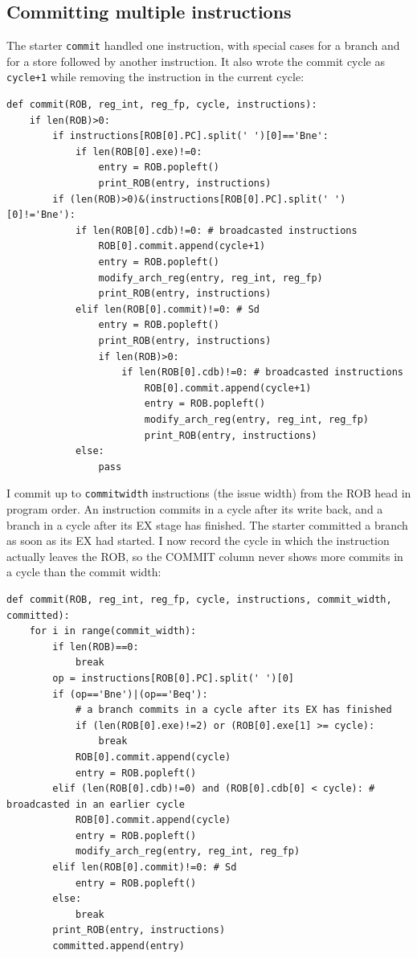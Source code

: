 \documentclass[11pt]{article}
\renewcommand{\_}{\origunderscore\allowbreak}
\begin{document}
\subsection{Committing multiple instructions}

The starter \texttt{commit} handled one instruction, with special cases for a branch and for a
store followed by another instruction. It also wrote the commit cycle as \texttt{cycle+1} while
removing the instruction in the current cycle:

\begin{lstlisting}
def commit(ROB, reg_int, reg_fp, cycle, instructions):
    if len(ROB)>0:
        if instructions[ROB[0].PC].split(' ')[0]=='Bne':
            if len(ROB[0].exe)!=0:
                entry = ROB.popleft()
                print_ROB(entry, instructions)
        if (len(ROB)>0)&(instructions[ROB[0].PC].split(' ')[0]!='Bne'):
            if len(ROB[0].cdb)!=0: # broadcasted instructions
                ROB[0].commit.append(cycle+1)
                entry = ROB.popleft()
                modify_arch_reg(entry, reg_int, reg_fp)
                print_ROB(entry, instructions)
            elif len(ROB[0].commit)!=0: # Sd
                entry = ROB.popleft()
                print_ROB(entry, instructions)
                if len(ROB)>0:
                    if len(ROB[0].cdb)!=0: # broadcasted instructions
                        ROB[0].commit.append(cycle+1)
                        entry = ROB.popleft()
                        modify_arch_reg(entry, reg_int, reg_fp)
                        print_ROB(entry, instructions)
            else:
                pass
\end{lstlisting}

I commit up to \texttt{commit\_width} instructions (the issue width) from the ROB head in program
order. An instruction commits in a cycle after its write back, and a branch in a cycle after its
EX stage has finished. The starter committed a branch as soon as its EX had started. I now record
the cycle in which the instruction actually leaves the ROB, so the COMMIT column never shows more
commits in a cycle than the commit width:

\begin{lstlisting}
def commit(ROB, reg_int, reg_fp, cycle, instructions, commit_width, committed):
    for i in range(commit_width):
        if len(ROB)==0:
            break
        op = instructions[ROB[0].PC].split(' ')[0]
        if (op=='Bne')|(op=='Beq'):
            # a branch commits in a cycle after its EX has finished
            if (len(ROB[0].exe)!=2) or (ROB[0].exe[1] >= cycle):
                break
            ROB[0].commit.append(cycle)
            entry = ROB.popleft()
        elif (len(ROB[0].cdb)!=0) and (ROB[0].cdb[0] < cycle): # broadcasted in an earlier cycle
            ROB[0].commit.append(cycle)
            entry = ROB.popleft()
            modify_arch_reg(entry, reg_int, reg_fp)
        elif len(ROB[0].commit)!=0: # Sd
            entry = ROB.popleft()
        else:
            break
        print_ROB(entry, instructions)
        committed.append(entry)
\end{lstlisting}
\end{document}
